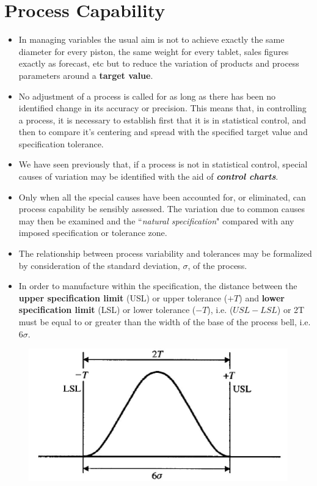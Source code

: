 \documentclass[11pt]{article} %
\begin{document}
\large
\section{Process Capability}
\begin{itemize}
\item In managing variables the usual aim is not to achieve exactly the same diameter for every piston, the same weight for every tablet, sales figures exactly as forecast, etc but to reduce the variation of products and process parameters around a \textbf{target value}. 
	
\item No adjustment of a process is called for as long as there has been no identified change in its accuracy or precision. This means that, in controlling a process, it is necessary to establish first that it is in statistical control, and then to compare it’s centering and spread with the specified target value and specification tolerance.
	
\item We have seen previously that, if a process is not in statistical control, special causes of variation may be identified with the aid of \textbf{\textit{control charts}}. 
	
\item Only when all the special causes have been accounted for, or
	eliminated, can process capability be sensibly assessed. The variation due to common causes may then be examined and the ``\textit{natural specification}" compared with any imposed specification or tolerance zone.
\item The relationship between process variability and tolerances may be formalized by consideration of the standard deviation, $\sigma$, of the process. 
	
	\item In order to manufacture within the specification, the distance between the \textbf{upper specification limit} (USL) or upper tolerance ($+T$) and \textbf{lower specification limit} (LSL) or lower tolerance ($-T$), i.e. ($USL-LSL$) or 2T must be equal to or greater than the width of the base of the process bell, i.e. $6\sigma$.
\end{itemize}

	

	
	\begin{figure}[h!]
		\centering
		\includegraphics[width=0.8\linewidth]{proccapindices/image1}
	\end{figure}
	
\end{document}
